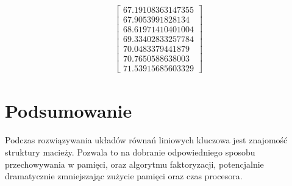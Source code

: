 \documentclass[11pt]{extarticle}
\begin{document}
\begin{align}
\begin{bmatrix}
			67.19108363147355 \\
			67.9053991828134 \\
			68.61971410401004 \\
			69.33402833257784 \\
			70.0483379441879 \\
			70.7650588638003 \\
			71.53915685603329
		\end{bmatrix}
	\end{align}
	
	\section{Podsumowanie}

	Podczas rozwiązywania układów równań liniowych kluczowa jest znajomość struktury macieży.
	Pozwala to na dobranie odpowiedniego sposobu przechowywania w pamięci, oraz algorytmu faktoryzacji,
	potencjalnie dramatycznie zmniejszając zużycie pamięci oraz czas procesora.
\end{document}
